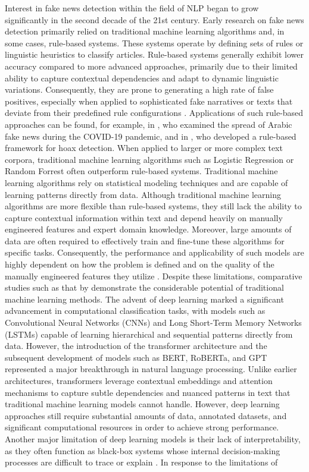 \documentclass[12pt,a4paper,twocolumn]{article}
\begin{document}
Interest in fake news detection within the field of NLP began to grow significantly in the second decade of the 21st century. Early research on fake news detection primarily relied on traditional machine learning algorithms and, in some cases, rule-based systems. These systems operate by defining sets of rules or linguistic heuristics to classify articles. Rule-based systems generally exhibit lower accuracy compared to more advanced approaches, primarily due to their limited ability to capture contextual dependencies and adapt to dynamic linguistic variations. Consequently, they are prone to generating a high rate of false positives, especially when applied to sophisticated fake narratives or texts that deviate from their predefined rule configurations \citep{polu2024ai, repede2023comparison}. Applications of such rule-based approaches can be found, for example, in \citet{alotaibi2022rule}, who examined the spread of Arabic fake news during the COVID-19 pandemic, and in \citet{yuliani2019framework}, who developed a rule-based framework for hoax detection. When applied to larger or more complex text corpora, traditional machine learning algorithms such as Logistic Regression or Random Forrest often outperform rule-based systems. Traditional machine learning algorithms rely on statistical modeling techniques and are capable of learning patterns directly from data. Although traditional machine learning algorithms are more flexible than rule-based systems, they still lack the ability to capture contextual information within text and depend heavily on manually engineered features and expert domain knowledge. Moreover, large amounts of data are often required to effectively train and fine-tune these algorithms for specific tasks. Consequently, the performance and applicability of such models are highly dependent on how the problem is defined and on the quality of the manually engineered features they utilize \citep{polu2024ai, pittman2025truthtextmetaanalysismlbased}. Despite these limitations, comparative studies such as that by \citet{Sudhakar2022Prediction} demonstrate the considerable potential of traditional machine learning methods. The advent of deep learning marked a significant advancement in computational classification tasks, with models such as Convolutional Neural Networks (CNNs) and Long Short-Term Memory Networks (LSTMs) capable of learning hierarchical and sequential patterns directly from data. However, the introduction of the transformer architecture and the subsequent development of models such as BERT, RoBERTa, and GPT represented a major breakthrough in natural language processing. Unlike earlier architectures, transformers leverage contextual embeddings and attention mechanisms to capture subtle dependencies and nuanced patterns in text that traditional machine learning models cannot handle. However, deep learning approaches still require substantial amounts of data, annotated datasets, and significant computational resources in order to achieve strong performance. Another major limitation of deep learning models is their lack of interpretability, as they often function as black-box systems whose internal decision-making processes are difficult to trace or explain \citep{polu2024ai, pittman2025truthtextmetaanalysismlbased}. In response to the limitations of 
\end{document}
